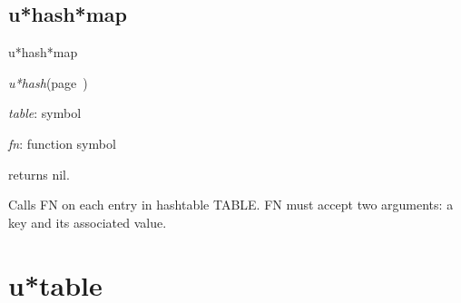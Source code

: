 \subsection{u*hash*map}
\label{u*hash*map}

\begin{description}
\item [Name:]  u*hash*map

\item [Class:]
{\sl u*hash}\hfill(page~\pageref{u*hash})

\item [Parameters:]
\item {\sl table}:  symbol

\item {\sl fn}:  function symbol


\item [Return-value:] returns nil.

\item [Description:]
Calls FN on each entry in hashtable TABLE. FN must
accept two arguments: a key and its associated value. 

\item [Public:]



\end{description}
\horizontalline

\section{u*table}
\label{u*table}

